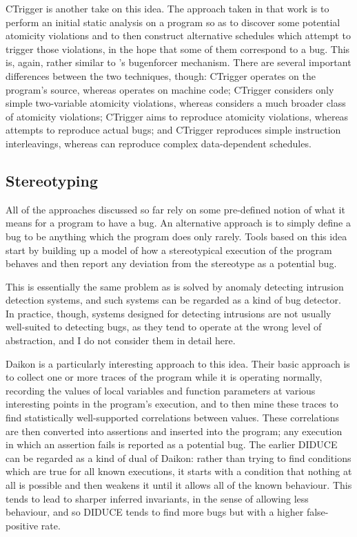 CTrigger\cite{Zhou} is another take on this idea.  The approach taken
in that work is to perform an initial static analysis on a program so
as to discover some potential atomicity violations and to then
construct alternative schedules which attempt to trigger those
violations, in the hope that some of them correspond to a bug.  This
is, again, rather similar to {\technique}'s \gls{bugenforcer}
mechanism.  There are several important differences between the two
techniques, though: CTrigger operates on the program's source, whereas
{\technique} operates on machine code; CTrigger considers only simple
two-variable atomicity violations, whereas {\technique} considers a
much broader class of atomicity violations; CTrigger aims to reproduce
atomicity violations, whereas {\technique} attempts to reproduce
actual bugs; and CTrigger reproduces simple instruction interleavings,
whereas {\technique} can reproduce complex data-dependent schedules.

\subsection{Stereotyping}

All of the approaches discussed so far rely on some pre-defined notion
of what it means for a program to have a bug.  An alternative approach
is to simply define a bug to be anything which the program does only
rarely.  Tools based on this idea start by building up a model of how
a stereotypical execution of the program behaves and then report any
deviation from the stereotype as a potential bug.

This is essentially the same problem as is solved by anomaly detecting
intrusion detection systems\cite{Forrest1996a}, and such systems can
be regarded as a kind of bug detector.  In practice, though, systems
designed for detecting intrusions are not usually well-suited to
detecting bugs, as they tend to operate at the wrong level of
abstraction, and I do not consider them in detail here.

Daikon\cite{Ernst2007} is a particularly interesting approach to this
idea.  Their basic approach is to collect one or more traces of the
program while it is operating normally, recording the values of local
variables and function parameters at various interesting points in the
program's execution, and to then mine these traces to find
statistically well-supported correlations between values.  These
correlations are then converted into assertions and inserted into the
program; any execution in which an assertion fails is reported as a
potential bug.  The earlier DIDUCE\cite{Hangal2002} can be regarded as
a kind of dual of Daikon: rather than trying to find conditions which
are true for all known executions, it starts with a condition that
nothing at all is possible and then weakens it until it allows all of
the known behaviour.  This tends to lead to sharper inferred
invariants, in the sense of allowing less behaviour, and so DIDUCE
tends to find more bugs but with a higher false-positive rate.

